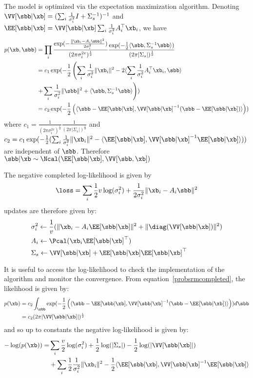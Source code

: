 The model is optimized via the expectation maximization algorithm.
Denoting $\VV[\sbb | \xb] = (\sum_i \frac1{\sigma_i^2} I +
\Sigma_s^{-1})^{-1}$ and $\EE[\sbb | \xb] = \VV[\sbb | \xb] \sum_i \frac1{\sigma_i^2}
A_i^{\top}\xb_i$, we have
\begin{align}
  p(\xb, \sbb) &= \prod_i \frac{\exp(-\frac{\|\xb_i - A_i \sbb \|^2}{2 \sigma_i^2})}{(2 \pi \sigma_i^{2v})^{\frac12}} \frac{\exp(-\frac12 \langle \sbb , \Sigma_s^{-1} \sbb \rangle )}{(2 \pi | \Sigma_s|)^{\frac12}} \\
               &= c_1 \exp(-\frac12 \left( \sum_i \frac1{\sigma_i^2}\|\xb_i\|^2 - 2  \langle \sum_i \frac1{\sigma_i^2} A_i^{\top}\xb_i, \sbb \rangle \right. \\& \left.+ \sum_i \frac1{\sigma_i^2} \| \sbb \|^2 + \langle \sbb, \Sigma_s^{-1} \sbb \rangle  \right)) \\
               &= c_2 \exp(-\frac12 \left( \langle  \sbb - \EE[\sbb | \xb], \VV[\sbb | \xb]^{-1} ( \sbb - \EE[\sbb | \xb])  \rangle \right)) \label{probsrmcompleted}
\end{align}
where $c_1 = \frac1{(2 \pi \sigma_i^{2v})^{\frac12}}\frac1{(2 \pi |
  \Sigma_s|)^{\frac12}}$ and $c_2 = c_1 \exp(-\frac12( \sum_i
\frac1{\sigma_i^2}\|\xb_i\|^2 - \langle  \EE[\sbb | \xb], \VV[\sbb | \xb]^{-1} \EE[\sbb | \xb] \rangle))$ are independent of $\sbb$.
Therefore $\sbb| \xb \sim \Ncal(\EE[\sbb | \xb], \VV[\sbb, \xb])$

The negative completed log-likelihood is given by
\begin{align}
	\loss = \sum_i \frac12 v \log(\sigma_i^2) + \frac1{2 \sigma_i^2} \| \xb_i - A_i \sbb \|^2
\end{align}
updates are therefore given by:
\begin{align}
&\sigma_i^2 \leftarrow \frac1{v} (\| \xb_i - A_i \EE[\sbb|\xb]\|^2 + \| \diag(\VV[\sbb | \xb]) \|^2) \\
  &A_i \leftarrow \Pcal(\xb_i \EE[\sbb|\xb]^{\top}) \\
  & \Sigma_s \leftarrow \VV[\sbb | \xb] + \EE[\sbb | \xb] \EE[\sbb | \xb]^{\top}
    \label{eq:srm:Aiupdate}
\end{align}

It is useful to access the log-likelihood to check the implementation of the
algorithm and monitor the convergence. From equation~\eqref{probsrmcompleted},
the likelihood is given by:
\begin{align}
  p(\xb) &= c_2 \int_{\sbb} \exp(-\frac12 \left( \langle  \sbb - \EE[\sbb | \xb], \VV[\sbb | \xb]^{-1} ( \sbb - \EE[\sbb | \xb])  \rangle \right)) d\sbb \\
         &= c_2 (2 \pi |\VV[\sbb | \xb]|)^{\frac12}
\end{align}
and so up to constants the negative log-likelihood is given by:
\begin{align}
  -\log(p(\xb)) = &\sum_i \frac{v}{2} \log(\sigma_i^2) + \frac12 \log(|\Sigma_s|) - \frac12 \log(|\VV[\sbb | \xb]|) \\ &+ \sum_i
  \frac12 \frac1{\sigma_i^2}\|\xb_i\|^2 - \frac12 \langle  \EE[\sbb | \xb], \VV[\sbb | \xb]^{-1} \EE[\sbb | \xb] \rangle
\end{align}

